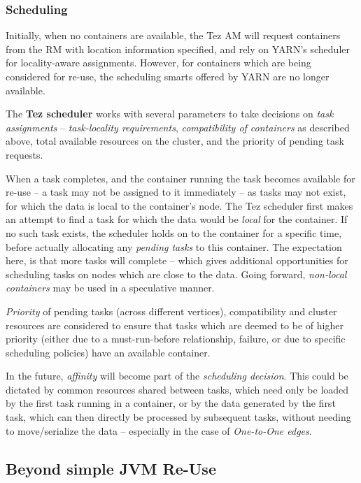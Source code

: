 \documentclass[twocolumn]{article}
\begin{document}
\subsubsection*{Scheduling}
Initially, when no containers are available, the Tez AM will request
containers from the RM with location information specified, and rely on
YARN's scheduler for locality-aware assignments. However, for containers
which are being considered for re-use, the scheduling smarts offered by
YARN are no longer available.

The \textbf{Tez scheduler} works with several parameters to take
decisions on \emph{task assignments} -- \emph{task-locality
requirements}, \emph{compatibility of containers} as described above,
total available resources on the cluster, and the priority of pending
task requests.

When a task completes, and the container running the task becomes
available for re-use -- a task may not be assigned to it immediately --
as tasks may not exist, for which the data is local to the container's
node. The Tez scheduler first makes an attempt to find a task for which
the data would be \emph{local} for the container. If no such task
exists, the scheduler holds on to the container for a specific time,
before actually allocating any \emph{pending tasks} to this container.
The expectation here, is that more tasks will complete -- which gives
additional opportunities for scheduling tasks on nodes which are close
to the data. Going forward, \emph{non-local containers} may be used in a
speculative manner.

\emph{Priority} of pending tasks (across different vertices),
compatibility and cluster resources are considered to ensure that tasks
which are deemed to be of higher priority (either due to a
must-run-before relationship, failure, or due to specific scheduling
policies) have an available container.

In the future, \emph{affinity} will become part of the \emph{scheduling
decision}. This could be dictated by common resources shared between
tasks, which need only be loaded by the first task running in a
container, or by the data generated by the first task, which can then
directly be processed by subsequent tasks, without needing to
move/serialize the data -- especially in the case of \emph{One-to-One
edges}.

\subsection{Beyond simple JVM Re-Use}
\end{document}
